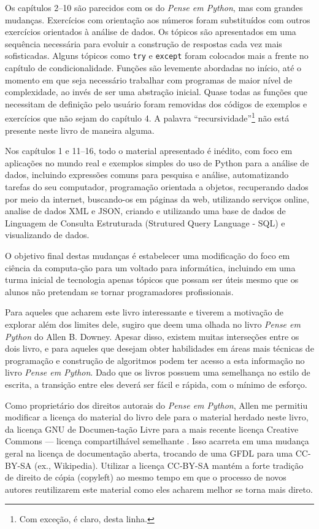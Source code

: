 Os capítulos 2--10 são parecidos com os do \emph{Pense em Python}, mas com grandes mudanças. Exercícios com orientação aos números foram substituídos com outros exercícios orientados à análise de dados. Os tópicos são apresentados em uma sequência necessária para evoluir a construção de respostas cada vez mais sofisticadas. Alguns tópicos como {\tt try} e {\tt except} foram colocados mais a frente no capítulo de condicionalidade.  Funções são levemente abordadas no início, até o momento em que seja necessário trabalhar com programas de maior nível de complexidade, ao invés de ser uma abstração inicial. Quase todas as funções que necessitam de definição pelo usuário foram removidas dos códigos de exemplos e exercícios que não sejam do capítulo 4. A palavra ``recursividade''\footnote{Com exceção, é claro, desta linha.} não está presente neste livro de maneira alguma. 

Nos capítulos 1 e 11--16, todo o material apresentado é inédito, com foco em aplicações no mundo real e exemplos simples do uso de Python para a análise de dados, incluindo expressões comuns para pesquisa e análise, automatizando tarefas do seu computador, programação orientada a objetos, recuperando dados por meio da internet, buscando-os em páginas da web, utilizando serviços online, analise de dados XML e JSON, criando e utilizando uma base de dados de Linguagem de Consulta Estruturada (Strutured Query Language - SQL) e visualizando de dados.




O objetivo final destas mudanças é estabelecer uma modificação do foco em ciência da computa-ção para um voltado para informática, incluindo em uma turma inicial de tecnologia apenas tópicos que possam ser úteis mesmo que os alunos não pretendam se tornar programadores profissionais.


Para aqueles que acharem este livro interessante e tiverem a motivação de explorar além dos limites dele, sugiro que deem uma olhada no livro \emph{Pense em Python} do Allen B. Downey. Apesar disso, existem muitas interseções entre os dois livro, e para aqueles que desejam obter habilidades em áreas mais técnicas de programação e construção de algoritmos podem ter acesso a esta informação no livro \emph{Pense em Python}. Dado que os livros possuem uma semelhança no estilo de escrita, a transição entre eles deverá ser fácil e rápida, com o mínimo de esforço.

Como proprietário dos direitos autorais do \emph{Pense em Python}, Allen me permitiu modificar a licença do material do livro dele para o material herdado neste livro, da  licença GNU de Documen-tação Livre para a mais recente licença Creative Commons --- licença compartilhável semelhante . Isso acarreta em uma mudança geral na licença de documentação aberta, trocando de uma GFDL para uma CC-BY-SA (ex., Wikipedia). Utilizar a licença CC-BY-SA mantém a forte tradição de direito de cópia (copyleft) ao mesmo tempo em que o processo de novos autores reutilizarem este material como eles acharem melhor se torna mais direto.

